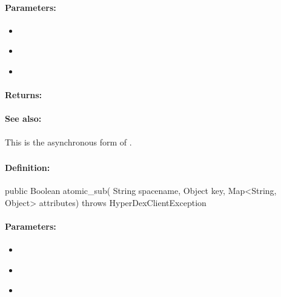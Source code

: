\paragraph{Parameters:}
\begin{itemize}[noitemsep]
\item {}\\

\item {}\\

\item {}\\

\end{itemize}

\paragraph{Returns:}


\paragraph{See also:}  This is the asynchronous form of .

\pagebreak
\subsubsection{}
\label{api:java:atomic_sub}


\paragraph{Definition:}
\begin{javacode}
public Boolean atomic_sub(
        String spacename,
        Object key,
        Map<String, Object> attributes) throws HyperDexClientException
\end{javacode}

\paragraph{Parameters:}
\begin{itemize}[noitemsep]
\item {}\\

\item {}\\

\item {}\\

\end{itemize}

